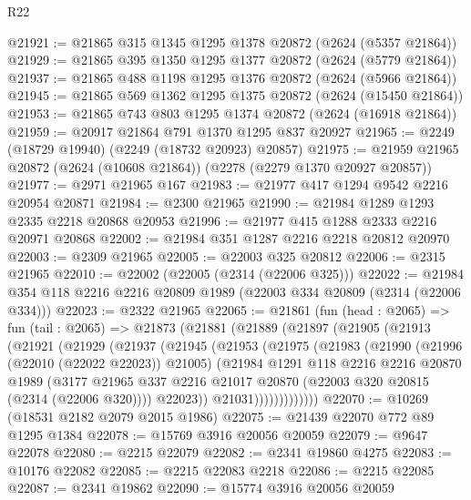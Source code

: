 \begin{lexlean}{R22}
\begin{coremodule}
@21921 := @21865 @315 @1345 @1295 @1378 @20872 (@2624 (@5357 @21864))
@21929 := @21865 @395 @1350 @1295 @1377 @20872 (@2624 (@5779 @21864))
@21937 := @21865 @488 @1198 @1295 @1376 @20872 (@2624 (@5966 @21864))
@21945 := @21865 @569 @1362 @1295 @1375 @20872 (@2624 (@15450 @21864))
@21953 := @21865 @743 @803 @1295 @1374 @20872 (@2624 (@16918 @21864))
@21959 := @20917 @21864 @791 @1370 @1295 @837 @20927
@21965 := @2249 (@18729 @19940) (@2249 (@18732 @20923) @20857)
@21975 := @21959 @21965 @20872 (@2624 (@10608 @21864)) (@2278 (@2279 @1370 @20927 @20857))
@21977 := @2971 @21965 @167
@21983 := @21977 @417 @1294 @9542 @2216 @20954 @20871
@21984 := @2300 @21965
@21990 := @21984 @1289 @1293 @2335 @2218 @20868 @20953
@21996 := @21977 @415 @1288 @2333 @2216 @20971 @20868
@22002 := @21984 @351 @1287 @2216 @2218 @20812 @20970
@22003 := @2309 @21965
@22005 := @22003 @325 @20812
@22006 := @2315 @21965
@22010 := @22002 (@22005 (@2314 (@22006 @325)))
@22022 := @21984 @354 @118 @2216 @2216 @20809 @1989 (@22003 @334 @20809 (@2314 (@22006 @334)))
@22023 := @2322 @21965
@22065 := @21861
    (fun (head : @2065) =>
    fun (tail : @2065) =>
    @21873
      (@21881
        (@21889
          (@21897
            (@21905
              (@21913
                (@21921
                  (@21929
                    (@21937
                      (@21945
                        (@21953
                          (@21975
                            (@21983
                              (@21990
                                (@21996 (@22010 (@22022 @22023)) @21005)
                                (@21984
                                  @1291
                                  @118
                                  @2216
                                  @2216
                                  @20870
                                  @1989
                                  (@3177
                                    @21965
                                    @337
                                    @2216
                                    @21017
                                    @20870
                                    (@22003 @320 @20815 (@2314 (@22006 @320))))
                                  @22023))
                              @21031)))))))))))))
@22070 := @10269 (@18531 @2182 @2079 @2015 @1986)
@22075 := @21439 @22070 @772 @89 @1295 @1384
@22078 := @15769 @3916 @20056 @20059
@22079 := @9647 @22078
@22080 := @2215 @22079
@22082 := @2341 @19860 @4275
@22083 := @10176 @22082
@22085 := @2215 @22083 @2218
@22086 := @2215 @22085
@22087 := @2341 @19862
@22090 := @15774 @3916 @20056 @20059

\end{coremodule}
\end{lexlean}
